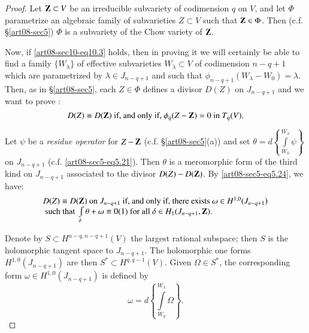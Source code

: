 \begin{proof}
Let $\mathbf{Z}\subset V$ be an irreducible subvariety of codimension $q$ on $V$, and let $\Phi$ parametrize an algebraic family of subvarieties $Z\subset V$ such that $\mathbf{Z}\in\Phi$. Then (c.f. \S\ref{art08-sec5}) $\Phi$ is a subvariety of the Chow variety of $\mathbf{Z}$.

Now, if \eqref{art08-sec10-eq10.3} holds, then in proving it we will certainly be able to find a family $\{W_{\lambda}\}$ of effective subvarieties $W_{\lambda}\subset V$ of codimension $n-q+1$ which are parametrized by $\lambda\in J_{n-q+1}$ and such that $\phi_{n-q+1}(W_{\lambda}-W_{0})=\lambda$. Then, as in \S\ref{art08-sec5}, each $Z\in \Phi$ defines a divisor $D(Z)$ on $J_{n-q+1}$ and we want to prove :
\begin{equation}
D(Z)\equiv D(\mathbf{Z})\text{ if, and only if, } \phi_{q}(Z-\mathbf{Z})=0\text{ in } T_{q}(V).\label{art08-sec10-eq10.11}
\end{equation}

Let $\psi$ be a {\em residue operator} for $Z-\mathbf{Z}$ (c.f. \S\ref{art08-sec5}(a)) and set $\theta=d\left\{\int\limits^{W_{\lambda}}_{W_{0}}\psi\right\}$ on $J_{n-q+1}$ (c.f. \eqref{art08-sec5-eq5.21}). Then $\theta$ is a meromorphic form of the third kind on $J_{n-q+1}$ associated to the divisor $D(Z)-D(\mathbf{Z})$. By \eqref{art08-sec5-eq5.24}, we have:
\begin{equation}
\begin{array}{l}
D(Z)\equiv D(\mathbf{Z})\text{ on } J_{n-q+1} \text{ if, and only if, there exists } \omega\in H^{1,0}(J_{n-q+1})\\
\text{ such that } \int\limits_{\delta}\theta+\omega\equiv 0(1)\text{ for all }\delta\in H_{1}(J_{n-q+1},\mathbf{Z}).
\end{array}\label{art08-sec10-eq10.12}
\end{equation}\pageoriginale

Denote by $S\subset H^{n-q,n-q+1}(V)$ the largest rational subspace; then $S$ is the holomorphic tangent space to $J_{n-q+1}$. The holomorphic one forms $H^{1,0}(J_{n-q+1})$ are then $S^{*}\subset H^{q,q-1}(V)$. Given $\Omega\in S^{*}$, the corresponding form $\omega\in H^{1,0}(J_{n-q+1})$ is defined by
$$
\omega= d\left\{\int\limits^{W_{\lambda}}_{W_{0}}\Omega\right\}.
$$


\end{proof}

